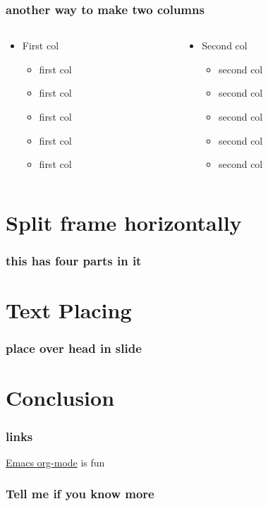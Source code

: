 \documentclass[10pt]{beamer}
\begin{document}
\begin{frame}
\frametitle{another way to make two columns}
\label{sec-2-3}
\begin{columns}
\begin{column}{.5\textwidth}
\begin{itemize}

\item First col
\label{sec-2-3-1}%
\begin{itemize}
\item first col
\item first col
\item first col
\item first col
\item first col
\end{itemize}

\end{itemize} %
\end{column}
\begin{column}{.5\textwidth}
\begin{itemize}

\item Second col
\label{sec-2-3-2}%
\begin{itemize}
\item second col
\item second col
\item second col
\item second col
\item second col
\end{itemize}

\end{itemize} %
\end{column}
\end{columns}
\end{frame}
\section{Split frame horizontally}
\label{sec-3}
\begin{frame}
\frametitle{this has four parts in it}
\label{sec-3-1}
\end{frame}
\section{Text Placing}
\label{sec-4}
\begin{frame}
\frametitle{place over head in slide}
\label{sec-4-1}
\end{frame}
\section{Conclusion}
\label{sec-5}
\begin{frame}
\frametitle{links}
\label{sec-5-1}

\href{http://orgmode.org}{Emacs org-mode} is fun
\end{frame}
\begin{frame}
\frametitle{Tell me if you know more}
\label{sec-5-2}
\end{frame}
\end{document}

